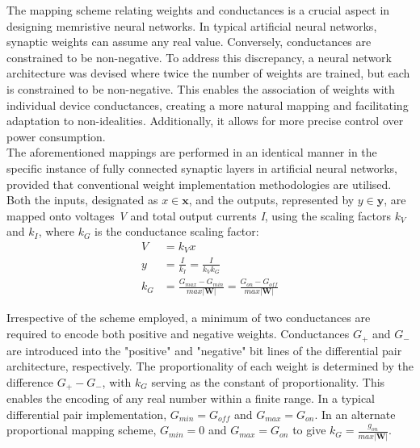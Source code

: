 
\noindent The mapping scheme relating weights and conductances is a crucial aspect in designing memristive neural networks. In typical artificial neural networks, synaptic weights can assume any real value. Conversely, conductances are constrained to be non-negative. To address this discrepancy, a neural network architecture was devised where twice the number of weights are trained, but each is constrained to be non-negative. This enables the association of weights with individual device conductances, creating a more natural mapping and facilitating adaptation to non-idealities. Additionally, it allows for more precise control over power consumption.\\

\noindent The aforementioned mappings are performed in an identical manner in the specific instance of fully connected synaptic layers in artificial neural networks, provided that conventional weight implementation methodologies are utilised. Both the inputs, designated as $x \in \mathbf{x}$, and the outputs, represented by $y \in \mathbf{y}$, are mapped onto voltages \textit{V} and total output currents \textit{I}, using the scaling factors $k_V$ and $k_I$, where $k_G$ is the conductance scaling factor:
\begin{align}
V &= k_V x \label{eq:6.26} \\
y &= \frac{I}{k_I} = \frac{I}{k_V k_G} \label{eq:6.27} \\
k_G &= \frac{G_{max} - G_{min}}{max |\mathbf{W}|} = \frac{G_{on} - G_{off}}{max |\mathbf{W}|}\label{eq:6.28}
\end{align}


\noindent  Irrespective of the scheme employed, a minimum of two conductances are required to encode both positive and negative weights. Conductances $G_+$ and $G_-$ are introduced into the "positive" and "negative" bit lines of the differential pair architecture, respectively. The proportionality of each weight is determined by the difference $G_+ - G_-$, with $k_G$ serving as the constant of proportionality. This enables the encoding of any real number within a finite range. In a typical differential pair implementation, $G_{min} = G_{off}$ and $G_{max} = G_{on}$. In an alternate proportional mapping scheme, $G_{min} = 0$ and $G_{max} = G_{on}$ to give $k_G = \frac{g_{on}}{max |\mathbf{W}|}$.\\

